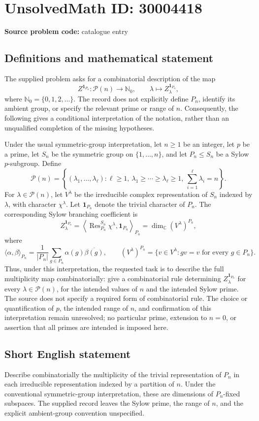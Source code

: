 \documentclass[11pt]{article}
\newcommand{\C}{\mathbb{C}}
\begin{document}
\section*{UnsolvedMath ID: 30004418}
\textbf{Source problem code:} catalogue entry
\subsection{Definitions and mathematical statement}
The supplied problem asks for a combinatorial description of the map
\[
Z^{\mathbf 1_{P_n}}:\mathcal P(n)\longrightarrow\mathbb N_0,
\qquad \lambda\longmapsto Z^{\mathbf 1_{P_n}}_\lambda,
\]
where \(\mathbb N_0=\{0,1,2,\ldots\}\). The record does not explicitly define \(P_n\), identify its ambient group, or specify the relevant prime or range of \(n\). Consequently, the following gives a conditional interpretation of the notation, rather than an unqualified completion of the missing hypotheses.

Under the usual symmetric-group interpretation, let \(n\geq 1\) be an integer, let \(p\) be a prime, let \(S_n\) be the symmetric group on \(\{1,\ldots,n\}\), and let \(P_n\leq S_n\) be a Sylow \(p\)-subgroup. Define
\[
\mathcal P(n)=\left\{(\lambda_1,\ldots,\lambda_\ell):\ell\geq 1,\ \lambda_1\geq\cdots\geq\lambda_\ell\geq 1,\ \sum_{i=1}^{\ell}\lambda_i=n\right\}.
\]
For \(\lambda\in\mathcal P(n)\), let \(V^\lambda\) be the irreducible complex representation of \(S_n\) indexed by \(\lambda\), with character \(\chi^\lambda\). Let \(\mathbf 1_{P_n}\) denote the trivial character of \(P_n\). The corresponding Sylow branching coefficient is
\[
Z^{\mathbf 1_{P_n}}_\lambda
=\left\langle\operatorname{Res}^{S_n}_{P_n}\chi^\lambda,\mathbf 1_{P_n}\right\rangle_{P_n}
=\dim_{\C}(V^\lambda)^{P_n},
\]
where
\[
\langle\alpha,\beta\rangle_{P_n}
=\frac{1}{|P_n|}\sum_{g\in P_n}\alpha(g)\overline{\beta(g)},
\qquad
(V^\lambda)^{P_n}=\{v\in V^\lambda:gv=v\text{ for every }g\in P_n\}.
\]
Thus, under this interpretation, the requested task is to describe the full multiplicity map combinatorially: give a combinatorial rule determining \(Z^{\mathbf 1_{P_n}}_\lambda\) for every \(\lambda\in\mathcal P(n)\), for the intended values of \(n\) and the intended Sylow prime. The source does not specify a required form of combinatorial rule. The choice or quantification of \(p\), the intended range of \(n\), and confirmation of this interpretation remain unresolved; no particular prime, extension to \(n=0\), or assertion that all primes are intended is imposed here.
\subsection{Short English statement}
Describe combinatorially the multiplicity of the trivial representation of \(P_n\) in each irreducible representation indexed by a partition of \(n\). Under the conventional symmetric-group interpretation, these are dimensions of \(P_n\)-fixed subspaces. The supplied record leaves the Sylow prime, the range of \(n\), and the explicit ambient-group convention unspecified.
\end{document}
